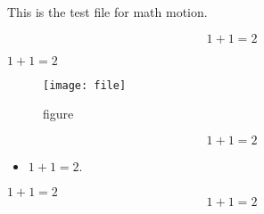 \documentclass[]{article}
\begin{document}
This is the test file for math motion.

\begin{equation}                             %
  1 + 1 = 2
\end{equation}                               %

\( 1 + 1 = 2 \)                              %

\begin{figure}
  \centering
  \texttt{[image: file]}
  \caption{figure}
  \label{fig:illustration}
\end{figure}
\[                                           %
  1 + 1 = 2
\]                                           %

\begin{itemize}
    \item $1 + 1 = 2$.                       %
\end{itemize}

$1 + 1 = 2$                                  %
$$1 + 1 = 2$$                                %
\end{document}
